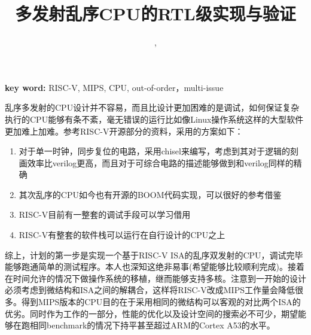 \documentclass[11pt]{article}
\title{多发射乱序CPU的RTL级实现与验证}
\author{\Name, \SID}
\date{}
\begin{document}
\maketitle
\textbf{key word: }RISC-V, MIPS, CPU, out-of-order，multi-issue

乱序多发射的CPU设计并不容易，而且比设计更加困难的是调试，如何保证复杂执行的CPU能够有条不紊，毫无错误的运行比如像Linux操作系统这样的大型软件更加难上加难。参考RISC-V开源部分的资料，采用的方案如下：
\begin{enumerate}
	\item 对于单一时钟，同步复位的电路，采用chisel来编写，考虑到其对于逻辑的刻画效率比verilog更高，而且对于可综合电路的描述能够做到和verilog同样的精确
	\item 其次乱序的CPU如今也有开源的BOOM代码实现，可以很好的参考借鉴
	\item RISC-V目前有一整套的调试手段可以学习借用
	\item RISC-V有整套的软件栈可以运行在自行设计的CPU之上
\end{enumerate}

综上，计划的第一步是实现一个基于RISC-V ISA的乱序双发射的CPU，调试完毕能够跑通简单的测试程序。本人也深知这绝非易事(希望能够比较顺利完成)。接着在时间允许的情况下做操作系统的移植，继而能够支持多核。注意到一开始的设计必须考虑到微结构和ISA之间的解耦合，这样将RISC-V改成MIPS工作量会降低很多。得到MIPS版本的CPU目的在于采用相同的微结构可以客观的对比两个ISA的优劣。同时作为工作的一部分，性能的优化以及设计空间的搜索必不可少，期望能够在跑相同benchmark的情况下持平甚至超过ARM的Cortex A53的水平。
\end{document}
